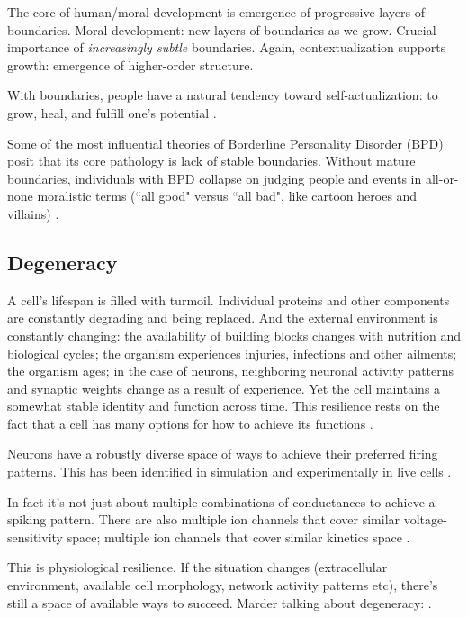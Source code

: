 The core of human/moral development is emergence of progressive layers of boundaries. Moral development: new layers of boundaries as we grow. Crucial importance of \textit{increasingly subtle} boundaries. Again, contextualization supports growth: emergence of higher-order structure.

With boundaries, people have a natural tendency toward self-actualization: to grow, heal, and fulfill one's potential \citep{rogers1959theory}.

Some of the most influential theories of Borderline Personality Disorder (BPD) posit that its core pathology is lack of stable boundaries. Without mature boundaries, individuals with BPD collapse on judging people and events in all-or-none moralistic terms (``all good" versus ``all bad", like cartoon heroes and villains) \citep{kernberg1975borderline, linehan1993cognitive}. 





\subsection{Degeneracy}

A cell's lifespan is filled with turmoil. Individual proteins and other components are constantly degrading and being replaced. And the external environment is constantly changing: the availability of building blocks changes with nutrition and biological cycles; the organism experiences injuries, infections and other ailments; the organism ages; in the case of neurons, neighboring neuronal activity patterns and synaptic weights change as a result of experience. Yet the cell maintains a somewhat stable identity and function across time. This resilience rests on the fact that a cell has many options for how to achieve its functions \citep{marder2006variability}.

Neurons have a robustly diverse space of ways to achieve their preferred firing patterns. This has been identified in simulation \citep{prinz2004similar} and experimentally in live cells \citep{schulz2006variable}.

In fact it's not just about multiple combinations of conductances to achieve a spiking pattern. There are also multiple ion channels that cover similar voltage-sensitivity space; multiple ion channels that cover similar kinetics space \citep{goaillard2021ion}.

This is physiological resilience. If the situation changes (extracellular environment, available cell morphology, network activity patterns etc), there's still a space of available ways to succeed. Marder talking about degeneracy: \citep{goaillard2021ion}.

